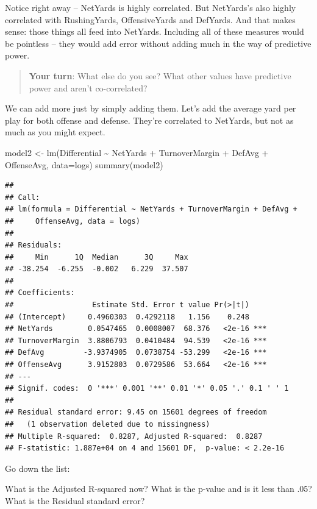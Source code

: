 \documentclass[
]{book}
\newenvironment{Shaded}{\begin{snugshade}}{\end{snugshade}}
\newcommand{\AttributeTok}[1]{\textcolor[rgb]{0.77,0.63,0.00}{#1}}
\newcommand{\FunctionTok}[1]{\textcolor[rgb]{0.00,0.00,0.00}{#1}}
\newcommand{\NormalTok}[1]{#1}
\newcommand{\OtherTok}[1]{\textcolor[rgb]{0.56,0.35,0.01}{#1}}
\newcommand{\SpecialCharTok}[1]{\textcolor[rgb]{0.00,0.00,0.00}{#1}}
\begin{document}
Notice right away -- NetYards is highly correlated. But NetYards's also highly correlated with RushingYards, OffensiveYards and DefYards. And that makes sense: those things all feed into NetYards. Including all of these measures would be pointless -- they would add error without adding much in the way of predictive power.

\begin{quote}
\textbf{Your turn}: What else do you see? What other values have predictive power and aren't co-correlated?
\end{quote}

We can add more just by simply adding them. Let's add the average yard per play for both offense and defense. They're correlated to NetYards, but not as much as you might expect.

\begin{Shaded}
\begin{Highlighting}[]
\NormalTok{model2 }\OtherTok{\textless{}{-}} \FunctionTok{lm}\NormalTok{(Differential }\SpecialCharTok{\textasciitilde{}}\NormalTok{ NetYards }\SpecialCharTok{+}\NormalTok{ TurnoverMargin }\SpecialCharTok{+}\NormalTok{ DefAvg }\SpecialCharTok{+}\NormalTok{ OffenseAvg, }\AttributeTok{data=}\NormalTok{logs)}
\FunctionTok{summary}\NormalTok{(model2)}
\end{Highlighting}
\end{Shaded}

\begin{verbatim}
## 
## Call:
## lm(formula = Differential ~ NetYards + TurnoverMargin + DefAvg + 
##     OffenseAvg, data = logs)
## 
## Residuals:
##     Min      1Q  Median      3Q     Max 
## -38.254  -6.255  -0.002   6.229  37.507 
## 
## Coefficients:
##                  Estimate Std. Error t value Pr(>|t|)    
## (Intercept)     0.4960303  0.4292118   1.156    0.248    
## NetYards        0.0547465  0.0008007  68.376   <2e-16 ***
## TurnoverMargin  3.8806793  0.0410484  94.539   <2e-16 ***
## DefAvg         -3.9374905  0.0738754 -53.299   <2e-16 ***
## OffenseAvg      3.9152803  0.0729586  53.664   <2e-16 ***
## ---
## Signif. codes:  0 '***' 0.001 '**' 0.01 '*' 0.05 '.' 0.1 ' ' 1
## 
## Residual standard error: 9.45 on 15601 degrees of freedom
##   (1 observation deleted due to missingness)
## Multiple R-squared:  0.8287, Adjusted R-squared:  0.8287 
## F-statistic: 1.887e+04 on 4 and 15601 DF,  p-value: < 2.2e-16
\end{verbatim}

Go down the list:

What is the Adjusted R-squared now?
What is the p-value and is it less than .05?
What is the Residual standard error?
\end{document}
